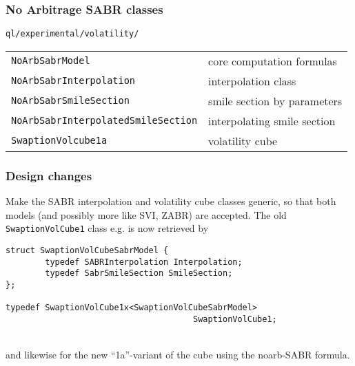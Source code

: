 \documentclass{beamer}
\begin{document}

\begin{frame}[fragile]
\frametitle{No Arbitrage SABR classes}

\verb+ql/experimental/volatility/+

\begin{table}
\begin{tabular}{l|l}
\verb+NoArbSabrModel+ & core computation formulas \\
\verb+NoArbSabrInterpolation+ & interpolation class \\
\verb+NoArbSabrSmileSection+ & smile section by parameters \\
\verb+NoArbSabrInterpolatedSmileSection+ & interpolating smile section \\
\verb+SwaptionVolcube1a+ & volatility cube 
\end{tabular}
\end{table}
\end{frame}

\begin{frame}[fragile]
\frametitle{Design changes}
Make the SABR interpolation and volatility cube classes generic, so that both models (and possibly more like SVI, ZABR) are accepted. The old \verb+SwaptionVolCube1+ class e.g. is now retrieved by 
\vspace{2mm}
\begin{verbatim}
struct SwaptionVolCubeSabrModel {
        typedef SABRInterpolation Interpolation;
        typedef SabrSmileSection SmileSection;
};

typedef SwaptionVolCube1x<SwaptionVolCubeSabrModel> 
                                      SwaptionVolCube1;

\end{verbatim}
\\
\vspace{2mm}
and likewise for the new ``1a''-variant of the cube using the noarb-SABR formula.
\end{frame}
\end{document}
